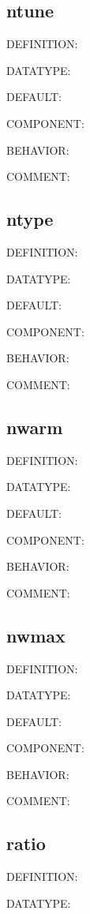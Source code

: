 \subsection{ntune}
{\color{red}DEFINITION:}

{\color{green}DATATYPE:}

{\color{blue}DEFAULT:}

{\color{brown}COMPONENT:}

{\color{purple}BEHAVIOR:}

{\color{olive}COMMENT:}

\subsection{ntype}
{\color{red}DEFINITION:}

{\color{green}DATATYPE:}

{\color{blue}DEFAULT:}

{\color{brown}COMPONENT:}

{\color{purple}BEHAVIOR:}

{\color{olive}COMMENT:}

\subsection{nwarm}
{\color{red}DEFINITION:}

{\color{green}DATATYPE:}

{\color{blue}DEFAULT:}

{\color{brown}COMPONENT:}

{\color{purple}BEHAVIOR:}

{\color{olive}COMMENT:}

\subsection{nwmax}
{\color{red}DEFINITION:}

{\color{green}DATATYPE:}

{\color{blue}DEFAULT:}

{\color{brown}COMPONENT:}

{\color{purple}BEHAVIOR:}

{\color{olive}COMMENT:}

\subsection{ratio}
{\color{red}DEFINITION:}

{\color{green}DATATYPE:}

